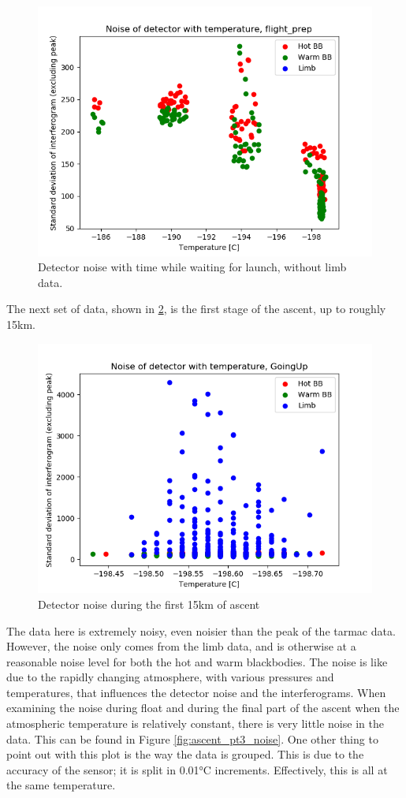 \begin{figure}[ht]
\centering
  \includegraphics[width=0.8\linewidth]{mct_noise_temp_plots/flight_prep_noisevstemp_invertedx_colours_no_limb.png}
  \caption{Detector noise with time while waiting for launch, without limb data.}
  \label{fig:flightprep_nolimb_noise}
\end{figure}

The next set of data, shown in \ref{fig:ascent_pt1_noise}, is the first stage of the ascent, up to roughly 15km. 

\begin{figure}[ht]
\centering
  \includegraphics[width=0.8\linewidth]{mct_noise_temp_plots/goingup_noisevtemp_invertedx_colours.png}
  \caption{Detector noise during the first 15km of ascent}
  \label{fig:ascent_pt1_noise}
\end{figure}

The data here is extremely noisy, even noisier than the peak of the tarmac data. However, the noise only comes from the limb data, and is otherwise at a reasonable noise level for both the hot and warm blackbodies. The noise is like due to the rapidly changing atmosphere, with various pressures and temperatures, that influences the detector noise and the interferograms. When examining the noise during float and during the final part of the ascent when the atmospheric temperature is relatively constant, there is very little noise in the data. This can be found in Figure \ref{fig:ascent_pt3_noise}. One other thing to point out with this plot is the way the data is grouped. This is due to the accuracy of the sensor; it is split in 0.01°C increments. Effectively, this is all at the same temperature.


